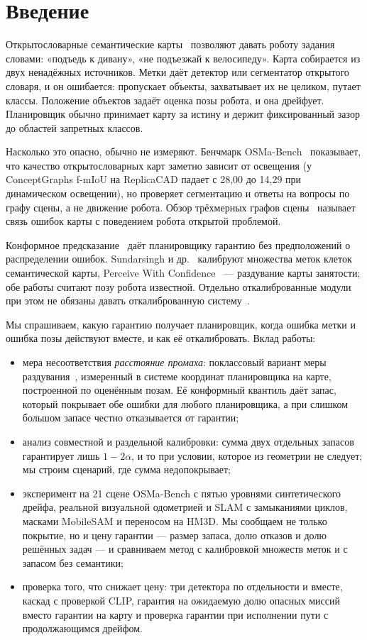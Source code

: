 \section{Введение}

Открытословарные семантические карты~\cite{conceptgraphs} позволяют давать роботу задания словами: «подъедь к дивану», «не подъезжай к велосипеду». Карта собирается из двух ненадёжных источников. Метки даёт детектор или сегментатор открытого словаря, и он ошибается: пропускает объекты, захватывает их не целиком, путает классы. Положение объектов задаёт оценка позы робота, и она дрейфует. Планировщик обычно принимает карту за истину и держит фиксированный зазор до областей запретных классов.

Насколько это опасно, обычно не измеряют. Бенчмарк OSMa-Bench~\cite{osmabench} показывает, что качество открытословарных карт заметно зависит от освещения (у ConceptGraphs f-mIoU на ReplicaCAD падает с 28,00 до 14,29 при динамическом освещении), но проверяет сегментацию и ответы на вопросы по графу сцены, а не движение робота. Обзор трёхмерных графов сцены~\cite{survey3dsg} называет связь ошибок карты с поведением робота открытой проблемой.

Конформное предсказание~\cite{gentle} даёт планировщику гарантию без предположений о распределении ошибок. Sundarsingh и др.~\cite{sundarsingh} калибруют множества меток клеток семантической карты, Perceive With Confidence~\cite{pwc} --- раздувание карты занятости; обе работы считают позу робота известной. Отдельно откалиброванные модули при этом не обязаны давать откалиброванную систему~\cite{baral}.

Мы спрашиваем, какую гарантию получает планировщик, когда ошибка метки и ошибка позы действуют вместе, и как её откалибровать. Вклад работы:
\begin{itemize}[nosep]
  \item мера несоответствия \emph{расстояние промаха}: поклассовый вариант меры раздувания~\cite{pwc}, измеренный в системе координат планировщика на карте, построенной по оценённым позам. Её конформный квантиль даёт запас, который покрывает обе ошибки для любого планировщика, а при слишком большом запасе честно отказывается от гарантии;
  \item анализ совместной и раздельной калибровки: сумма двух отдельных запасов гарантирует лишь $1 - 2\alpha$, и то при условии, которое из геометрии не следует; мы строим сценарий, где сумма недопокрывает;
  \item эксперимент на 21 сцене OSMa-Bench с пятью уровнями синтетического дрейфа, реальной визуальной одометрией и SLAM с замыканиями циклов, масками MobileSAM и переносом на HM3D. Мы сообщаем не только покрытие, но и цену гарантии --- размер запаса, долю отказов и долю решённых задач --- и сравниваем метод с калибровкой множеств меток и с запасом без семантики;
  \item проверка того, что снижает цену: три детектора по отдельности и вместе, каскад с проверкой CLIP, гарантия на ожидаемую долю опасных миссий вместо гарантии на карту и проверка гарантии при исполнении пути с продолжающимся дрейфом.
\end{itemize}
